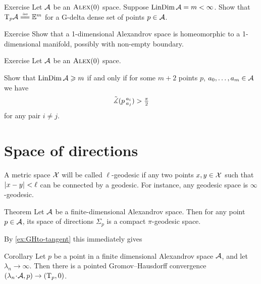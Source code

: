 \begin{thm}{Exercise}\label{ex:tangent=Em}
Let $\mathcal{A}$ be an $\textsc{Alex}(0)$ space.
Suppose $\mathop{\rm LinDim}\nolimits\mathcal{A}=m<\infty$.
Show that $\T_p\spc{A}\iso \EE^m$ for a G-delta dense set of points $p\in\mathcal{A}$.
\end{thm}

\begin{thm}{Exercise}\label{ex:dim=1}
Show that a 1-dimensional Alexandrov space is homeomorphic to a 1-dimensional manifold, possibly with non-empty boundary.
\end{thm}


\begin{thm}{Exercise}\label{ex:resporka}
Let $\mathcal{A}$ be an $\textsc{Alex}(0)$ space.

Show that $\mathop{\rm LinDim}\nolimits \mathcal{A}\geqslant m$ if and only if for some $m+2$ points $p$, $a_0,\dots, a_{m}\in \mathcal{A}$
we have
\[\tilde\measuredangle(p\,{}^{a_i}_{a_j})>\tfrac\pi2\]
for any pair $i\ne j$.
\end{thm}

\section{Space of directions}

A metric space $\mathcal{X}$ will be called $\ell$-geodesic 
if any two points $x,y\in\mathcal{X}$ such that $|{x}-{y}|_{}^{{}}<\ell$ can be connected by a geodesic.
For instance, any geodesic space is $\infty$-geodesic.

\begin{thm}{Theorem}\label{thm:finite-space-of-directions}
Let $\mathcal{A}$ be a finite-dimensional Alexandrov space.
Then for any point $p\in \mathcal{A}$, its space of directions $\Sigma_p$ is a compact $\pi$-geodesic space.
\end{thm}


By  \ref{ex:GHto-tangent} this immediately gives 

\begin{thm}{Corollary}\label{ex:GHto-tangent-finite-dim}
Let $p$ be a point in a finite dimensional Alexandrov space $\mathcal{A}$,
and let $\lambda_n\to\infty$.
Then there is a pointed Gromov--Hausdorff convergence $(\lambda_n\cdot \spc{A},p)\z\to (\T_p,0)$.
\end{thm}


